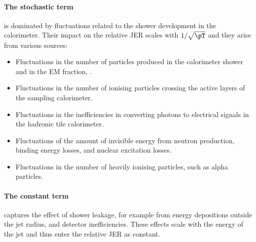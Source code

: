 \paragraph{The stochastic term} is dominated by fluctuations related to the shower development in the calorimeter. Their impact on the relative JER scales with $1 / \sqrt{\pT}$ and they arise from various sources:
\begin{itemize}
    \item Fluctuations in the number of particles produced in the calorimeter shower and in the EM fraction, \fEM.
    \item Fluctuations in the number of ionising particles crossing the active layers of the sampling calorimeter.
    \item Fluctuations in the inefficiencies in converting photons to electrical signals in the hadronic tile calorimeter.
    \item Fluctuations of the amount of invisible energy from neutron production, binding energy losses, and nuclear excitation losses.
    \item Fluctuations in the number of heavily ionising particles, such as alpha particles.
\end{itemize}

\paragraph{The constant term} captures the effect of shower leakage, for example from energy depositions outside the jet radius, and detector inefficiencies. These effects scale with the energy of the jet and thus enter the relative JER as constant.

